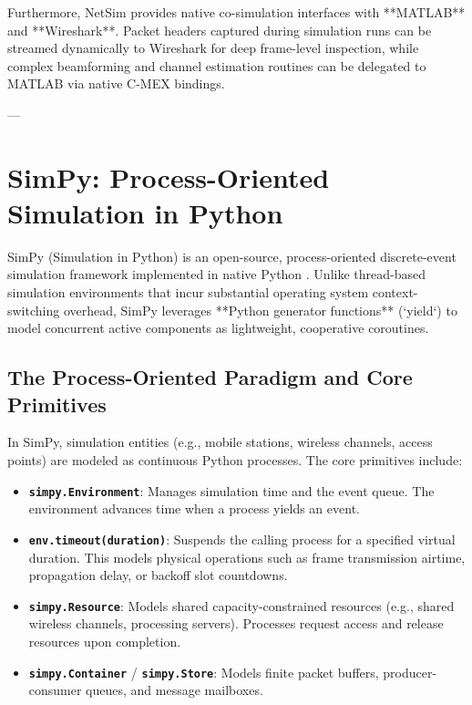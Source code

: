 Furthermore, NetSim provides native co-simulation interfaces with **MATLAB** and **Wireshark**. Packet headers captured during simulation runs can be streamed dynamically to Wireshark for deep frame-level inspection, while complex beamforming and channel estimation routines can be delegated to MATLAB via native C-MEX bindings.

---

\section{SimPy: Process-Oriented Simulation in Python}
\label{sec:simpy_framework}

SimPy (Simulation in Python) is an open-source, process-oriented discrete-event simulation framework implemented in native Python \cite{matloff2008introduction}. Unlike thread-based simulation environments that incur substantial operating system context-switching overhead, SimPy leverages **Python generator functions** (`yield`) to model concurrent active components as lightweight, cooperative coroutines.

\subsection{The Process-Oriented Paradigm and Core Primitives}
In SimPy, simulation entities (e.g., mobile stations, wireless channels, access points) are modeled as continuous Python processes. The core primitives include:
\begin{itemize}
    \item \textbf{\texttt{simpy.Environment}}: Manages simulation time and the event queue. The environment advances time when a process yields an event.
    \item \textbf{\texttt{env.timeout(duration)}}: Suspends the calling process for a specified virtual duration. This models physical operations such as frame transmission airtime, propagation delay, or backoff slot countdowns.
    \item \textbf{\texttt{simpy.Resource}}: Models shared capacity-constrained resources (e.g., shared wireless channels, processing servers). Processes request access and release resources upon completion.
    \item \textbf{\texttt{simpy.Container}} / \textbf{\texttt{simpy.Store}}: Models finite packet buffers, producer-consumer queues, and message mailboxes.
\end{itemize}

